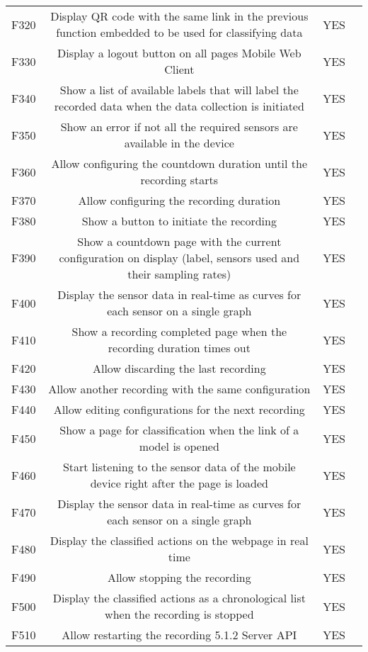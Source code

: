 \begin{center}
{\begin{tabular}{c||c|c|c}
        F320 & Display QR code with the same link in the previous function embedded to be used for classifying data & YES &  \\
        F330 & Display a logout button on all pages Mobile Web Client & YES &  \\
        F340 & Show a list of available labels that will label the recorded data when the data collection is initiated & YES &  \\
        F350 & Show an error if not all the required sensors are available in the device & YES &  \\
        F360 & Allow configuring the countdown duration until the recording starts & YES &  \\
        F370 & Allow configuring the recording duration & YES &  \\
        F380 & Show a button to initiate the recording & YES &  \\
        F390 & Show a countdown page with the current configuration on display (label, sensors used and their sampling rates) & YES &  \\
        F400 & Display the sensor data in real-time as curves for each sensor on a single graph & YES &  \\
        F410 & Show a recording completed page when the recording duration times out  & YES &  \\
        F420 & Allow discarding the last recording  & YES &  \\
        F430 & Allow another recording with the same configuration  & YES &  \\
        F440 & Allow editing configurations for the next recording  & YES &  \\
        F450 & Show a page for classification when the link of a model is opened & YES &  \\
        F460 & Start listening to the sensor data of the mobile device right after the page is loaded & YES &  \\
        F470 & Display the sensor data in real-time as curves for each sensor on a single graph  & YES &  \\
        F480 & Display the classified actions on the webpage in real time  & YES &  \\
        F490 & Allow stopping the recording & YES &  \\
        F500 & Display the classified actions as a chronological list when the recording is stopped & YES &  \\
        F510 & Allow restarting the recording 5.1.2 Server API & YES &  \\

\end{tabular}}
\end{center}
